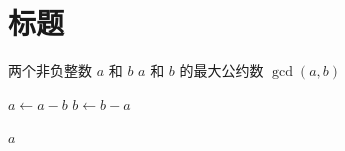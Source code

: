 \documentclass[fontset=fandol]{ustcthesis}
\begin{document}
\START
\showoutput

\frontmatter
\listofalgorithms
\clearpage
\OMIT

\mainmatter
\chapter{标题}
\clearpage

\TIMO
\begin{algorithm}
  \caption{欧几里得算法}
  \label{alg:euclid}
  \begin{algorithmic}
    \REQUIRE 两个非负整数 $a$ 和 $b$
    \ENSURE $a$ 和 $b$ 的最大公约数 $\gcd(a, b)$

        \STATE $a \gets a - b$
      \ELSE
        \STATE $b \gets b - a$
      \ENDIF
    \ENDWHILE

    \RETURN $a$
  \end{algorithmic}
\end{algorithm}

\clearpage
\OMIT
\end{document}
